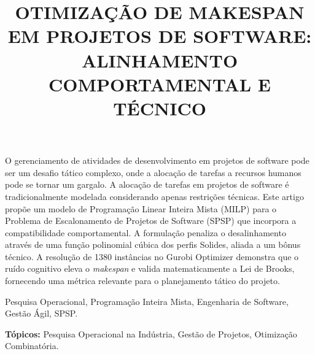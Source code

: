 \documentclass[a4paper,11pt]{article}
\begin{document}
\title{OTIMIZAÇÃO DE MAKESPAN EM PROJETOS DE SOFTWARE: \\
ALINHAMENTO COMPORTAMENTAL E TÉCNICO}

\maketitle
\thispagestyle{fancy}

\author{
}

\author{ 
}

\vspace{5mm}
\begin{resumo}
    O gerenciamento de atividades de desenvolvimento em projetos de software
    pode ser um desafio tático complexo, onde a alocação de tarefas a recursos
    humanos pode se tornar um gargalo. A alocação de tarefas em projetos de
    software é tradicionalmente modelada considerando apenas restrições técnicas.
    Este artigo propõe um modelo de Programação Linear Inteira Mista (MILP) para
    o Problema de Escalonamento de Projetos de Software (SPSP) que incorpora a
    compatibilidade comportamental. A formulação penaliza o desalinhamento através
    de uma função polinomial cúbica dos perfis Solides, aliada a um bônus técnico.
    A resolução de 1380 instâncias no Gurobi Optimizer demonstra que o ruído cognitivo
    eleva o \textit{makespan} e valida matematicamente a Lei de Brooks, fornecendo
    uma métrica relevante para o planejamento tático do projeto.
\end{resumo}

\begin{palchaves}
Pesquisa Operacional, Programação Inteira Mista, Engenharia de Software, 
Gestão Ágil, SPSP.

\vspace{0.3cm}
\noindent \textbf{Tópicos:} Pesquisa Operacional na Indústria, Gestão de Projetos, 
Otimização Combinatória.
\end{palchaves}

\vspace{5mm}
\end{document}
